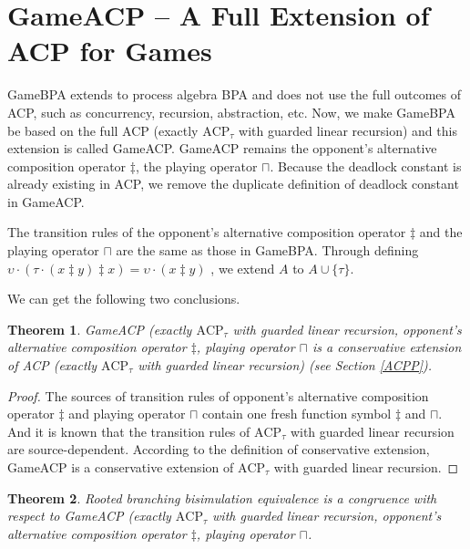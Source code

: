\documentclass{fac}
\newtheorem{theorem}{Theorem}[section]
\begin{document}
\section{GameACP -- A Full Extension of ACP for Games}

GameBPA extends to process algebra BPA and does not use the full outcomes of ACP, such as concurrency, recursion, abstraction, etc. Now, we make GameBPA be based on the full ACP (exactly $\textrm{ACP}_\tau$ with guarded linear recursion) and this extension is called GameACP. GameACP remains the opponent's alternative composition operator $\ddagger$, the playing operator $\sqcap$. Because the deadlock constant is already existing in ACP, we remove the duplicate definition of deadlock constant in GameACP.

The transition rules of the opponent's alternative composition operator $\ddagger$ and the playing operator $\sqcap$ are the same as those in GameBPA. Through defining $\upsilon \cdot (\tau\cdot(x \ddagger y) \ddagger x) = \upsilon \cdot (x \ddagger y)$ , we extend $A$ to $A\cup \{\tau\}$.

We can get the following two conclusions.

\begin{theorem}
GameACP (exactly $\textrm{ACP}_\tau$ with guarded linear recursion, opponent's alternative composition operator $\ddagger$, playing operator $\sqcap$ is a conservative extension of ACP (exactly $\textrm{ACP}_\tau$ with guarded linear recursion) (see Section \ref{ACPP}).
\end{theorem}

\begin{proof}
The sources of transition rules of opponent's alternative composition operator $\ddagger$ and playing operator $\sqcap$ contain one fresh function symbol $\ddagger$ and $\sqcap$. And it is known that the transition rules of $\textrm{ACP}_\tau$ with guarded linear recursion are source-dependent. According to the definition of conservative extension, GameACP is a conservative extension of $\textrm{ACP}_\tau$ with guarded linear recursion.
\end{proof}

\begin{theorem}
Rooted branching bisimulation equivalence is a congruence with respect to GameACP (exactly $\textrm{ACP}_\tau$ with guarded linear recursion, opponent's alternative composition operator $\ddagger$, playing operator $\sqcap$.
\end{theorem}
\end{document}
